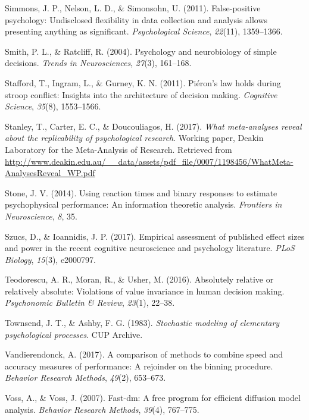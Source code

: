 \documentclass[floatsintext,doc]{apa6}
\theoremstyle{definition}
\theoremstyle{definition}
\theoremstyle{definition}
\theoremstyle{remark}
\begin{document}
\hypertarget{ref-simmons2011false}{}
Simmons, J. P., Nelson, L. D., \& Simonsohn, U. (2011). False-positive
psychology: Undisclosed flexibility in data collection and analysis
allows presenting anything as significant. \emph{Psychological Science},
\emph{22}(11), 1359--1366.

\hypertarget{ref-smith2004psychology}{}
Smith, P. L., \& Ratcliff, R. (2004). Psychology and neurobiology of
simple decisions. \emph{Trends in Neurosciences}, \emph{27}(3),
161--168.

\hypertarget{ref-stafford2011pieron}{}
Stafford, T., Ingram, L., \& Gurney, K. N. (2011). Piéron's law holds
during stroop conflict: Insights into the architecture of decision
making. \emph{Cognitive Science}, \emph{35}(8), 1553--1566.

\hypertarget{ref-stanleymeta}{}
Stanley, T., Carter, E. C., \& Doucouliagos, H. (2017). \emph{What
meta-analyses reveal about the replicability of psychological research}.
Working paper, Deakin Laboratory for the Meta-Analysis of Research.
Retrieved from
\url{http://www.deakin.edu.au/__data/assets/pdf_file/0007/1198456/WhatMeta-AnalysesReveal_WP.pdf}

\hypertarget{ref-stone2014using}{}
Stone, J. V. (2014). Using reaction times and binary responses to
estimate psychophysical performance: An information theoretic analysis.
\emph{Frontiers in Neuroscience}, \emph{8}, 35.

\hypertarget{ref-szucs2017empirical}{}
Szucs, D., \& Ioannidis, J. P. (2017). Empirical assessment of published
effect sizes and power in the recent cognitive neuroscience and
psychology literature. \emph{PLoS Biology}, \emph{15}(3), e2000797.

\hypertarget{ref-teodorescu2016absolutely}{}
Teodorescu, A. R., Moran, R., \& Usher, M. (2016). Absolutely relative
or relatively absolute: Violations of value invariance in human decision
making. \emph{Psychonomic Bulletin \& Review}, \emph{23}(1), 22--38.

\hypertarget{ref-townsend1983stochastic}{}
Townsend, J. T., \& Ashby, F. G. (1983). \emph{Stochastic modeling of
elementary psychological processes}. CUP Archive.

\hypertarget{ref-vandierendonck2017comparison}{}
Vandierendonck, A. (2017). A comparison of methods to combine speed and
accuracy measures of performance: A rejoinder on the binning procedure.
\emph{Behavior Research Methods}, \emph{49}(2), 653--673.

\hypertarget{ref-voss2007fast}{}
Voss, A., \& Voss, J. (2007). Fast-dm: A free program for efficient
diffusion model analysis. \emph{Behavior Research Methods},
\emph{39}(4), 767--775.
\end{document}
